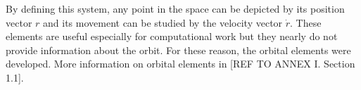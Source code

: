 By defining this system, any point in the space can be depicted by its position vector $r$ and its movement can be studied by the velocity vector $\dot{r}$. These elements are useful especially for computational work but they nearly do not provide information about the orbit. For these reason, the orbital elements were developed. More information on orbital elements in [{REF TO ANNEX I. Section 1.1}].
%
